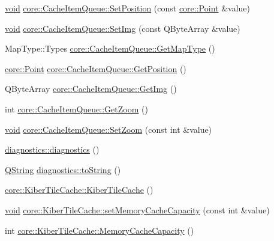 \begin{DoxyCompactItemize}
\item 
\hyperlink{group___u_a_v_objects_plugin_ga444cf2ff3f0ecbe028adce838d373f5c}{void} \hyperlink{group___o_p_map_widget_ga085e1a1de0ae2d6b9d8c6786f922c6a7}{core\-::\-Cache\-Item\-Queue\-::\-Set\-Position} (const \hyperlink{structcore_1_1_point}{core\-::\-Point} \&value)
\item 
\hyperlink{group___u_a_v_objects_plugin_ga444cf2ff3f0ecbe028adce838d373f5c}{void} \hyperlink{group___o_p_map_widget_gaf1ff6340158da1ba5139ba7c442758cd}{core\-::\-Cache\-Item\-Queue\-::\-Set\-Img} (const \-Q\-Byte\-Array \&value)
\item 
\-Map\-Type\-::\-Types \hyperlink{group___o_p_map_widget_gac72aa0d2725fa7a43d69620e086eb6b4}{core\-::\-Cache\-Item\-Queue\-::\-Get\-Map\-Type} ()
\item 
\hyperlink{structcore_1_1_point}{core\-::\-Point} \hyperlink{group___o_p_map_widget_ga1fa7cca0baacf348206a3f015041f07b}{core\-::\-Cache\-Item\-Queue\-::\-Get\-Position} ()
\item 
\-Q\-Byte\-Array \hyperlink{group___o_p_map_widget_ga6a02a2e0a6cefcd82c2fad88dcdbd89e}{core\-::\-Cache\-Item\-Queue\-::\-Get\-Img} ()
\item 
int \hyperlink{group___o_p_map_widget_gadfe7e49ddc244b2d8b26f9087d954f7d}{core\-::\-Cache\-Item\-Queue\-::\-Get\-Zoom} ()
\item 
\hyperlink{group___u_a_v_objects_plugin_ga444cf2ff3f0ecbe028adce838d373f5c}{void} \hyperlink{group___o_p_map_widget_ga0780a9a7876dc6fbb7aa3bc7b5465956}{core\-::\-Cache\-Item\-Queue\-::\-Set\-Zoom} (const int \&value)
\item 
\hyperlink{group___o_p_map_widget_ga9fb2a8142ddf0bad7dc111d9f792f456}{diagnostics\-::diagnostics} ()
\item 
\hyperlink{group___u_a_v_objects_plugin_gab9d252f49c333c94a72f97ce3105a32d}{\-Q\-String} \hyperlink{group___o_p_map_widget_gac7639db946ccc37305c9a915ab7816cc}{diagnostics\-::to\-String} ()
\item 
\hyperlink{group___o_p_map_widget_gab36dfabac7ab5e960efd54b890b15173}{core\-::\-Kiber\-Tile\-Cache\-::\-Kiber\-Tile\-Cache} ()
\item 
\hyperlink{group___u_a_v_objects_plugin_ga444cf2ff3f0ecbe028adce838d373f5c}{void} \hyperlink{group___o_p_map_widget_ga53ccfe7e5f07ce218a4920d86b7fa95e}{core\-::\-Kiber\-Tile\-Cache\-::set\-Memory\-Cache\-Capacity} (const int \&value)
\item 
int \hyperlink{group___o_p_map_widget_ga1ac798743593d55d294a659bf03cd367}{core\-::\-Kiber\-Tile\-Cache\-::\-Memory\-Cache\-Capacity} ()

\end{DoxyCompactItemize}
